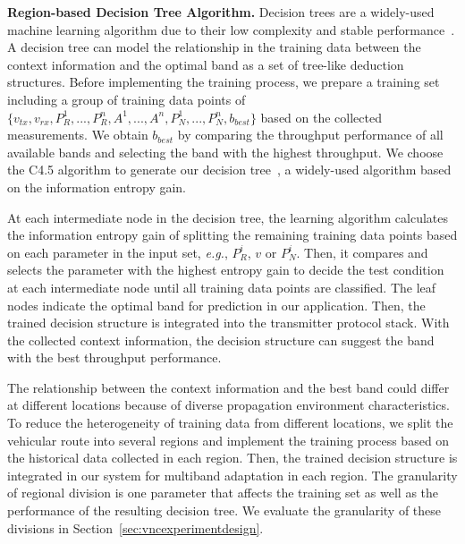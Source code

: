 {\bf Region-based Decision Tree Algorithm.} Decision trees are a  
widely-used machine learning 
algorithm due to their low complexity and stable performance~\cite{banfield2007}.
A decision tree can model the relationship in the training data between the context 
information and the optimal band as a set of tree-like deduction structures. Before 
implementing the training process, we prepare a training set including a group of 
training data points of $\{v_{tx}, v_{rx}, P_R^1, ..., P_R^n,  A^1, ..., A^n, P_N^1, 
..., P_N^n, b_{best}\}$ based on the collected measurements. We obtain $b_{best}$ by comparing
the throughput performance of all available bands and selecting the band with the highest 
throughput. We choose the C4.5 algorithm to generate our decision tree~\cite{hall2009weka}, a widely-used algorithm based on the 
information entropy gain. 

At each intermediate
node in the decision tree, the learning algorithm calculates the information entropy 
gain of splitting the remaining training data points based on each parameter in the input 
set, {\it e.g.}, $P_R^i$, $v$ or $P_N^i$. Then, it compares and selects the parameter with 
the highest entropy gain to decide the test condition at each intermediate node until 
all training data points are classified.  The leaf nodes indicate the optimal band for 
prediction in our application. Then, the trained decision structure is integrated into 
the transmitter protocol stack. With the collected context information, the decision 
structure can suggest the band with the best throughput performance. 

The relationship between the context information and the best band could differ at
different locations because of diverse propagation environment characteristics. 
To reduce the heterogeneity of training data from different locations, we split 
the vehicular route into several regions and implement the training process based 
on the historical data collected in each region. Then, the trained decision structure 
is integrated in our system for multiband adaptation in each region. The granularity 
of regional division is one parameter that affects the training set as well as the 
performance of the resulting decision tree. We 
evaluate the granularity of these divisions in Section~\ref{sec:vncexperimentdesign}.
